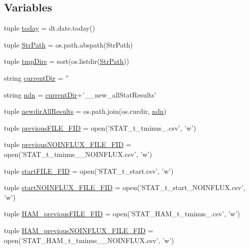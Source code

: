 \subsection*{Variables}
\begin{DoxyCompactItemize}
\item 
tuple \hyperlink{a00104_ac99ee9d8196d8a2305b9f4c795b23b97}{today} = dt.\-date.\-today()
\item 
tuple \hyperlink{a00104_ac34f3f43f888eb6620266d78ce928ceb}{Str\-Path} = os.\-path.\-abspath(Str\-Path)
\item 
tuple \hyperlink{a00104_ab71c19ee20acae0f07934a8d0e9fe50b}{tmp\-Dirs} = sort(os.\-listdir(\hyperlink{a00104_ac34f3f43f888eb6620266d78ce928ceb}{Str\-Path}))
\item 
string \hyperlink{a00104_ae98225d5c8c20399f5c3b888fa37746f}{current\-Dir} = ''
\item 
string \hyperlink{a00104_a5e117df6e0cdffdae13947622c6c4890}{ndn} = \hyperlink{a00104_ae98225d5c8c20399f5c3b888fa37746f}{current\-Dir}+'\-\_\-\_\-new\-\_\-all\-Stat\-Results'
\item 
tuple \hyperlink{a00104_a62d6cfd52b4428ab7ea4d75d43b2d49b}{newdir\-All\-Results} = os.\-path.\-join(os.\-curdir, \hyperlink{a00104_a5e117df6e0cdffdae13947622c6c4890}{ndn})
\item 
tuple \hyperlink{a00104_aba65725a1bd6d1b891b02dc7f3db2335}{previous\-F\-I\-L\-E\-\_\-\-F\-I\-D} = open('S\-T\-A\-T\-\_\-t\-\_\-tminus\-\_.\-csv', 'w')
\item 
tuple \hyperlink{a00104_a9f9485bf6f7a3734bbd110b756005b71}{previous\-N\-O\-I\-N\-F\-L\-U\-X\-\_\-\-F\-I\-L\-E\-\_\-\-F\-I\-D} = open('S\-T\-A\-T\-\_\-t\-\_\-tminus\-\_\-\_\-\-N\-O\-I\-N\-F\-L\-U\-X.\-csv', 'w')
\item 
tuple \hyperlink{a00104_a0239a9dcc4900463a0c19557bec23521}{start\-F\-I\-L\-E\-\_\-\-F\-I\-D} = open('S\-T\-A\-T\-\_\-t\-\_\-start.\-csv', 'w')
\item 
tuple \hyperlink{a00104_a44f4f158af9771fbabbbacc4f4484d32}{start\-N\-O\-I\-N\-F\-L\-U\-X\-\_\-\-F\-I\-L\-E\-\_\-\-F\-I\-D} = open('S\-T\-A\-T\-\_\-t\-\_\-start\-\_\-\-N\-O\-I\-N\-F\-L\-U\-X.\-csv', 'w')
\item 
tuple \hyperlink{a00104_a3aad86d2cdbfb6f36b4b563b190d76c9}{H\-A\-M\-\_\-previous\-F\-I\-L\-E\-\_\-\-F\-I\-D} = open('S\-T\-A\-T\-\_\-\-H\-A\-M\-\_\-t\-\_\-tminus\-\_.\-csv', 'w')
\item 
tuple \hyperlink{a00104_a621d86851e86f9c83bb0add9ec741d7f}{H\-A\-M\-\_\-previous\-N\-O\-I\-N\-F\-L\-U\-X\-\_\-\-F\-I\-L\-E\-\_\-\-F\-I\-D} = open('S\-T\-A\-T\-\_\-\-H\-A\-M\-\_\-t\-\_\-tminus\-\_\-\_\-\-N\-O\-I\-N\-F\-L\-U\-X.\-csv', 'w')

\end{DoxyCompactItemize}
